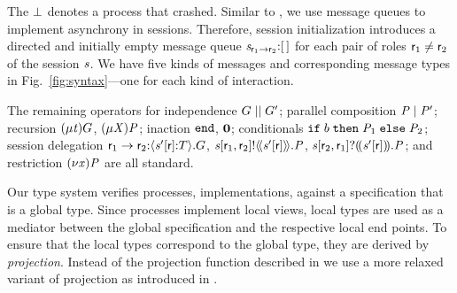 The $ \PCrash $ denotes a process that crashed.
Similar to \cite{hondaYoshidaCarbone16}, we use message queues to implement asynchrony in sessions.
Therefore, session initialization introduces a directed and initially empty message queue $ \MQ{\Chan[s]}{\Role_1}{\Role_2}{\emptyList} $ for each pair of roles $ \Role_1 \neq \Role_2 $ of the session $ \Chan[s] $.
We have five kinds of messages and corresponding message types in Fig.~\ref{fig:syntax}---one for each kind of interaction.

The remaining operators for independence $ \GPar{\GT}{\GT'} $; parallel composition $ \PPar{\PT}{\PT'} $; recursion $ \GRep{\TypeV}{\GT} $, $ \PRep{\ProcV}{\PT} $; inaction $ \GEnd $, $ \PEnd $; conditionals $ \PITE{\Expr[b]}{\PT_1}{\PT_2} $; session delegation $ \GDel{\Role_1}{\Role_2}{\Chan'}{\Role}{\LT}{\GT} $, $ \PDelA{\Chan}{\Role_1}{\Role_2}{\AT{\Chan'}{\Role}}{\PT} $, $ \PDelB{\Chan}{\Role_2}{\Role_1}{\AT{\Chan'}{\Role}}{\PT} $; and restriction $ \PRes{\Args}{\PT} $ are all standard.

Our type system verifies processes, \ie implementations, against a specification that is a global type.
Since processes implement local views, local types are used as a mediator between the global specification and the respective local end points.
To ensure that the local types correspond to the global type, they are derived by \emph{projection}.
Instead of the projection function described in \cite{hondaYoshidaCarbone16} we use a more relaxed variant of projection as introduced in \cite{YoshidaDanielouBejleriHu10}.

